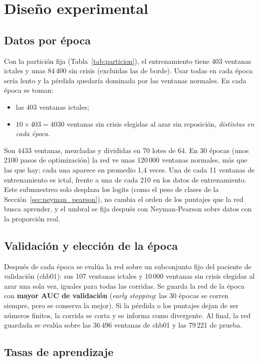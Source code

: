 \section{Diseño experimental}
\label{sec:diseno}

\subsection{Datos por época}

Con la partición fija (Tabla~\ref{tab:particion}), el entrenamiento tiene 403 ventanas ictales y unas 84\,400 sin crisis
(excluidas las de borde). Usar todas en cada época sería lento y la pérdida quedaría dominada por las ventanas normales. En
cada época se toman:
\begin{itemize}
  \item las 403 ventanas ictales;
  \item $10 \times 403 = 4030$ ventanas sin crisis elegidas al azar sin reposición, \emph{distintas en cada época}.
\end{itemize}
Son 4433 ventanas, mezcladas y divididas en 70 lotes de 64. En 30 épocas (unos 2100 pasos de optimización) la red ve
unas 120\,000 ventanas normales, más que las que hay: cada una aparece en promedio 1,4 veces. Una de cada 11 ventanas de
entrenamiento es ictal, frente a una de cada 210 en los datos de entrenamiento. Este submuestreo solo desplaza los logits (como el peso
de clases de la Sección~\ref{sec:neyman_pearson}), no cambia el orden de los puntajes que la red busca aprender, y el umbral
se fija después con Neyman-Pearson sobre datos con la proporción real.

\subsection{Validación y elección de la época}

Después de cada época se evalúa la red sobre un subconjunto fijo del paciente de validación (chb01): sus 107 ventanas
ictales y 10\,000 ventanas sin crisis elegidas al azar una sola vez, iguales para todas las corridas. Se guarda la red de la
época con \textbf{mayor AUC de validación} (\emph{early stopping}: las 30 épocas se corren siempre, pero se conserva la mejor).
Si la pérdida o los puntajes dejan de ser números finitos, la corrida se corta y se informa como divergente. Al final, la red
guardada se evalúa sobre las 36\,496 ventanas de chb01 y las 79\,221 de prueba.

\subsection{Tasas de aprendizaje}

